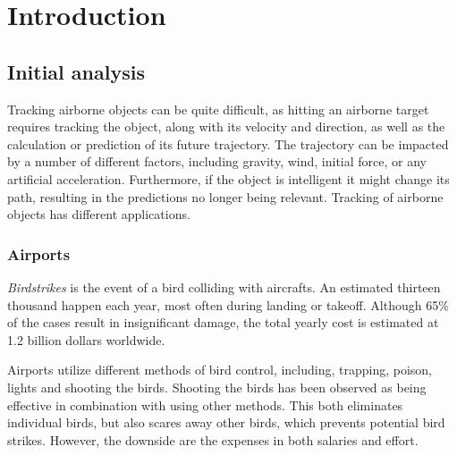 \chapter{Introduction}
\section{Initial analysis}
Tracking airborne objects can be quite difficult, as hitting an airborne target requires tracking the object, along with its velocity and direction, as well as the calculation or prediction of its future trajectory.
The trajectory can be impacted by a number of different factors, including gravity, wind, initial force, or any artificial acceleration.
Furthermore, if the object is intelligent it might change its path, resulting in the predictions no longer being relevant.
Tracking of airborne objects has different applications.
\subsection{Airports}
\textit{Birdstrikes} is the event of a bird colliding with aircrafts\cite{WildlifeStrikeReport}.
An estimated thirteen thousand happen each year, most often during landing or takeoff\cite{CostOfBirdstrikes}.
Although 65\% of the cases result in insignificant damage, the total yearly cost is estimated at 1.2 billion dollars worldwide\cite{CostOfBirdstrikes}.


Airports utilize different methods of bird control, including, trapping, poison, lights and shooting the birds\cite{BirdControlAtAirports}.
Shooting the birds has been observed as being effective in combination with using other methods.
This both eliminates individual birds, but also scares away other birds, which prevents potential bird strikes.
However, the downside are the expenses in both salaries and effort.

